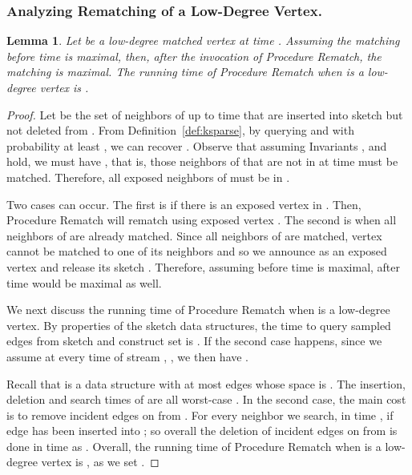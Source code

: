 \documentclass[11pt,letter]{article}
\newtheorem{lemma}[theorem]{Lemma}
\begin{document}
\subsubsection{Analyzing Rematching of a Low-Degree Vertex.}

\begin{lemma}
\label{lem:low:rematch}
Let  be a low-degree matched vertex at time .
Assuming the matching  before time  is maximal,
then, after the invocation of Procedure {\sf Rematch}, the matching  is maximal.
The running time of Procedure {\sf Rematch}
when  is a low-degree vertex is .
\end{lemma}

\begin{proof}
Let  be the set of neighbors of  up to time 
that are inserted into sketch  but not deleted from .
From Definition~\ref{def:ksparse},
by querying  and with probability at least
, we can recover .
Observe that assuming Invariants ,  and  hold, we must have
, that is, those neighbors of
 that are not in  at time  must be matched.
Therefore, all exposed neighbors of  must be in .

Two cases can occur. The first is if there is an exposed vertex  in .
Then, Procedure {\sf Rematch} will rematch  using exposed vertex .
The second is when all neighbors of  are already matched. Since all neighbors of 
are matched, vertex  cannot be matched to one of its neighbors and
so we announce  as an exposed vertex and release its sketch .
Therefore, assuming  before time  is maximal,  after time 
would be maximal as well.

We next discuss the running time of Procedure {\sf Rematch}
when  is a low-degree vertex.
By properties of the sketch data structures,
the time to query  sampled edges from sketch  and construct set
 is .
If the second case happens, since we assume at every time of stream , ,
we then have .

Recall that  is a data structure with at most  edges
whose space is . The insertion, deletion and
search times of  are all worst-case .
In the second case, the main cost is to remove incident edges
on  from .
For every neighbor  we search, in time ,
if edge  has been inserted into ; so overall the deletion of incident
edges on  from  is done in time 
as . Overall, the running time of Procedure {\sf Rematch}
when  is a low-degree vertex is , as we set .
\end{proof}
\end{document}
